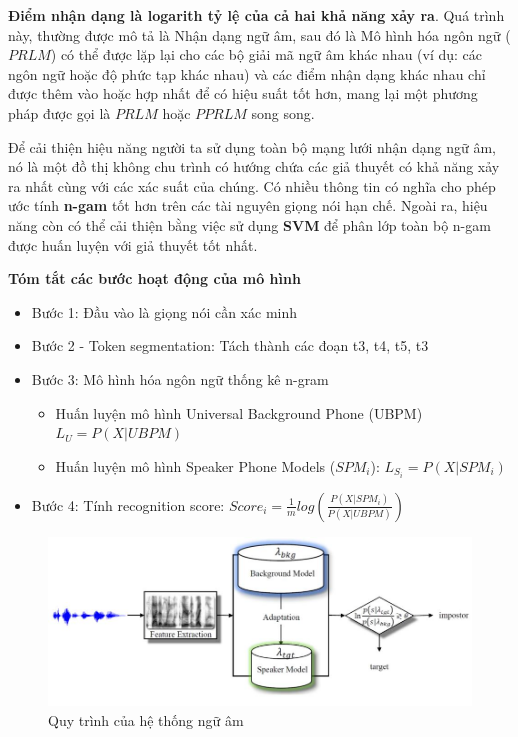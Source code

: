 \documentclass{article}
\begin{document}
	\textbf{Điểm nhận dạng là logarith tỷ lệ của cả hai khả năng xảy ra}. Quá trình này, thường được mô tả là Nhận dạng ngữ âm, sau đó là Mô hình hóa ngôn ngữ ($PRLM$) có thể được lặp lại cho các bộ giải mã ngữ âm khác nhau (ví dụ: các ngôn ngữ hoặc độ phức tạp khác nhau) và các điểm nhận dạng khác nhau chỉ được thêm vào hoặc hợp nhất để có hiệu suất tốt hơn, mang lại một phương pháp được gọi là $PRLM$ hoặc $PPRLM$ song song.
	
	Để cải thiện hiệu năng người ta sử dụng toàn bộ mạng lưới nhận dạng ngữ âm, nó là một đồ thị không chu trình có hướng chứa các giả thuyết có khả năng xảy ra nhất cùng với các xác suất của chúng. Có nhiều thông tin có nghĩa cho phép ước tính \textbf{n-gam} tốt hơn trên các tài nguyên giọng nói hạn chế. Ngoài ra, hiệu năng còn có thể cải thiện bằng việc sử dụng \textbf{SVM} để phân lớp toàn bộ n-gam được huấn luyện với giả thuyết tốt nhất.
	
	\textbf{Tóm tắt các bước hoạt động của mô hình}
	\begin{itemize}
		\item Bước 1: Đầu vào là giọng nói cần xác minh
		\item Bước 2 - Token segmentation: Tách thành các đoạn t3, t4, t5, t3
		\item Bước 3: Mô hình hóa ngôn ngữ thống kê n-gram
		\begin{itemize}
			\item Huấn luyện mô hình Universal Background Phone (UBPM) $L_{U} = P(X|UBPM)$
			\item Huấn luyện mô hình Speaker Phone Models ($SPM_{i}$): $L_{S_{i}} = P(X | SPM_{i})$
		\end{itemize}
		\item Bước 4: Tính recognition score: $Score_{i} = \frac{1}{m}log\left(\frac{P(X | SPM_{i})}{P(X|UBPM)}\right)$
	\end{itemize}

	\begin{figure}[H]
		\centering
		\includegraphics[width=1\linewidth]{images/diagram.png}
		\caption{Quy trình của hệ thống ngữ âm}
		\label{fig:writing-thesis}
	\end{figure}
	
\end{document}
